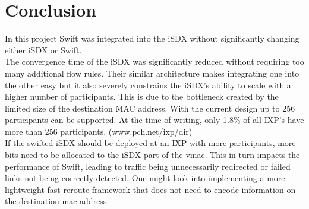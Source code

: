 \chapter{\label{chapter7}Conclusion}
In this project Swift was integrated into the iSDX without significantly changing either iSDX or Swift. \\
The convergence time of the iSDX was significantly reduced without requiring too many additional flow rules. Their similar architecture makes integrating one into the other easy but it also severely constrains the iSDX's ability to scale with a higher number of participants. This is due to the bottleneck created by the limited size of the destination MAC address. With the current design up to 256 participants can be supported. At the time of writing, only 1.8\% of all IXP's have more than 256 participants. (www.pch.net/ixp/dir)  \\
If the swifted iSDX should be deployed at an IXP with more participants, more bits need to be allocated to the iSDX part of the vmac. This in turn impacts the performance of Swift, leading to traffic being unnecessarily redirected or failed links not being correctly detected. One might look into implementing a more lightweight fast reroute framework that does not need to encode information on the destination mac address.
